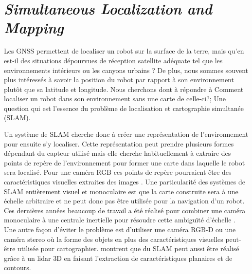 \section{\textit{Simultaneous Localization and Mapping}}\label{subsec:reconstruction}

Les GNSS permettent de localiser un robot sur la surface de la terre, mais qu'en est-il des situations dépourvues de réception satellite adéquate tel que les environnements intérieurs ou les \guillemotleft canyons urbains \guillemotright ? De plus, nous sommes souvent plus intéressés à savoir la position du robot par rapport à son environnement plutôt que sa latitude et longitude. Nous cherchons dont à répondre à \guillemotleft Comment localiser un robot dans son environnement sans une carte de celle-ci?\guillemotright; Une question qui est l'essence du problème de localisation et cartographie simultanée (SLAM).

Un système de SLAM cherche donc à créer une représentation de l'environnement pour ensuite s'y localiser. Cette représentation peut prendre plusieurs formes dépendant du capteur utilisé mais elle cherche habituellement à extraire des points de repère de l'environnement pour former une carte dans laquelle le robot sera localisé. Pour une caméra RGB ces points de repère pourraient être des caractéristiques visuelles extraites des images \citep{Mur-Artal2017}. Une particularité des systèmes de SLAM entièrement visuel et monoculaire est que la carte construite sera à une échelle arbitraire et ne peut donc pas être utilisée pour la navigation d'un robot. Ces dernières années beaucoup de travail a été réalisé pour combiner une caméra monoculaire à une centrale inertielle pour résoudre cette ambiguïté d'échelle \citep{muratal2017vimonoslam}. Une autre façon d'éviter le problème est d'utiliser une caméra RGB-D ou une caméra stereo où la forme des objets en plus des caractéristiques visuelles peut-être utilisée \citep{henry2014rgb} pour cartographier. \cite{Zhang2017} montrent que du SLAM peut aussi être réalisé grâce à un lidar 3D en faisant l'extraction de caractéristiques planaires et de contours.

